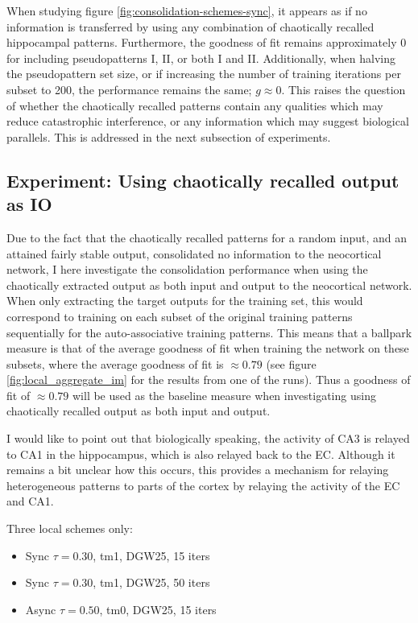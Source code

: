 When studying figure \ref{fig:consolidation-schemes-sync}, it appears as if no information is transferred by using any combination of chaotically recalled hippocampal patterns. Furthermore, the goodness of fit remains approximately 0 for including pseudopatterns I, II, or both I and II. Additionally, when halving the pseudopattern set size, or if increasing the number of training iterations per subset to 200, the performance remains the same; $g\approx 0$. This raises the question of whether the chaotically recalled patterns contain any qualities which may reduce catastrophic interference, or any information which may suggest biological parallels. This is addressed in the next subsection of experiments.

\subsection{Experiment: Using chaotically recalled output as IO}

Due to the fact that the chaotically recalled patterns for a random input, and an attained fairly stable output, consolidated no information to the neocortical network, I here investigate the consolidation performance when using the chaotically extracted output as both input and output to the neocortical network. When only extracting the target outputs for the training set, this would correspond to training on each subset of the original training patterns sequentially for the auto-associative training patterns. This means that a ballpark measure is that of the average goodness of fit when training the network on these subsets, where the average goodness of fit is $\approx 0.79$ (see figure \ref{fig:local_aggregate_im} for the results from one of the runs). Thus a goodness of fit of $\approx 0.79$ will be used as the baseline measure when investigating using chaotically recalled output as both input and output.

I would like to point out that biologically speaking, the activity of CA3 is relayed to CA1 in the hippocampus, which is also relayed back to the EC. Although it remains a bit unclear how this occurs, this provides a mechanism for relaying heterogeneous patterns to parts of the cortex by relaying the activity of the EC and CA1.

Three local schemes only:
\begin{itemize}
    \item Sync $\tau=0.30$, tm1, DGW25, 15 iters
    \item Sync $\tau=0.30$, tm1, DGW25, 50 iters
    \item Async $\tau=0.50$, tm0, DGW25, 15 iters
\end{itemize}

